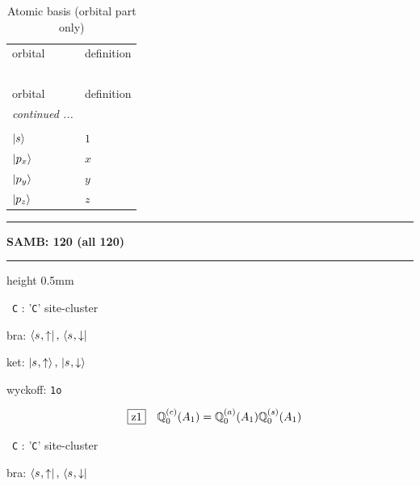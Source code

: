 \documentclass[fleqn,10pt,landscape]{jsarticle}
\begin{document}
\begin{longtable}[l]{ll}
\captionsetup{justification=raggedright, singlelinecheck=off}
\caption{Atomic basis (orbital part only)}
 \\
 \hline \hline
orbital & definition \\ \hline \endfirsthead

\multicolumn{1}{l}{\tablename\ \thetable{}} \\
 \hline \hline
orbital & definition \\ \hline \endhead

 \hline \hline
\multicolumn{1}{r}{\footnotesize\it continued ...} \\ \endfoot

 \hline \hline
\multicolumn{1}{r}{} \\ \endlastfoot

$ \ket{s} $ & $ 1 $ \\ \hline
$ \ket{p_{x}} $ & $ x $ \\
$ \ket{p_{y}} $ & $ y $ \\
$ \ket{p_{z}} $ & $ z $ \\
\end{longtable}
\vspace{5mm}
\noindent \rule[0.5mm]{5mm}{0.5mm}\hspace{3mm}\textbf{SAMB: 120 (all 120)}\hspace{3mm}\leaders\hrule height 0.5mm\hfill\kern0pt
\vspace{3mm}

\vspace{5mm}

\noindent\textbullet\, \texttt{C} : '\texttt{C}' site-cluster

\noindent\quad * bra: $\bra{s_{},\uparrow},\, \bra{s_{},\downarrow}$

\noindent\quad * ket: $\ket{s_{},\uparrow},\, \ket{s_{},\downarrow}$

\noindent\quad * wyckoff: \texttt{1o}

\begin{dmath*}
\hspace*{3mm}\fbox{z1}\quad \mathbb{Q}_{0}^{(c)}(A_{1})=\mathbb{Q}_{0}^{(a)}(A_{1}) \mathbb{Q}_{0}^{(s)}(A_{1})
\end{dmath*}
\vspace{5mm}

\noindent\textbullet\, \texttt{C} : '\texttt{C}' site-cluster

\noindent\quad * bra: $\bra{s_{},\uparrow},\, \bra{s_{},\downarrow}$
\end{document}
